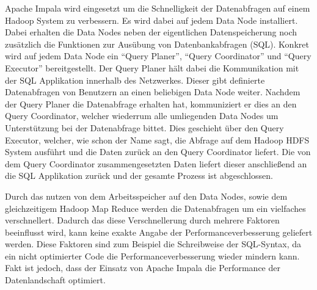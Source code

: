 Apache Impala wird eingesetzt um die Schnelligkeit der Datenabfragen auf
einem Hadoop System zu verbessern. Es wird dabei auf jedem Data Node
installiert. Dabei erhalten die Data Nodes neben der eigentlichen
Datenspeicherung noch zusätzlich die Funktionen zur Ausübung von
Datenbankabfragen (SQL). Konkret wird auf jedem Data Node ein ``Query Planer'',
``Query Coordinator'' und ``Query Executor'' bereitgestellt. Der Query Planer
hält dabei die Kommunikation mit der SQL Applikation innerhalb des Netzwerkes.
Dieser gibt definierte Datenabfragen von Benutzern an einen beliebigen Data
Node weiter. Nachdem der Query Planer die Datenabfrage erhalten hat,
kommuniziert er dies an den Query Coordinator, welcher wiederrum alle
umliegenden Data Nodes um Unterstützung bei der Datenabfrage bittet.
Dies geschieht über den Query Executor, welcher, wie schon der Name sagt,
die Abfrage auf dem Hadoop HDFS System ausführt und die Daten zurück an den
Query Coordinator liefert. Die von dem Query Coordinator zusammengesetzten
Daten liefert dieser anschließend an die SQL Applikation zurück und der
gesamte Prozess ist abgeschlossen.

Durch das nutzen von dem Arbeitsspeicher auf den Data Nodes, sowie dem
gleichzeitigem Hadoop Map Reduce werden die Datenabfragen um ein vielfaches
verschnellert. Dadurch das diese Verschnellerung durch mehrere Faktoren
beeinflusst wird, kann keine exakte Angabe der Performanceverbesserung
geliefert werden. Diese Faktoren sind zum Beispiel die Schreibweise der
SQL-Syntax, da ein nicht optimierter Code die Performanceverbesserung
wieder mindern kann. Fakt ist jedoch, dass der Einsatz von Apache Impala
die Performance der Datenlandschaft optimiert.
\nl%

